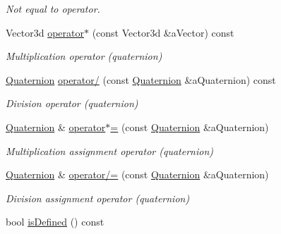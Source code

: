 \begin{DoxyCompactItemize}
\begin{DoxyCompactList}\small\item\em Not equal to operator. \end{DoxyCompactList}\item 
Vector3d \hyperlink{classlibrary_1_1math_1_1geom_1_1d3_1_1trf_1_1rot_1_1_quaternion_a7f09ef0c53cb1f2d68a5c0aa8fb9de56}{operator$\ast$} (const Vector3d \&a\+Vector) const
\begin{DoxyCompactList}\small\item\em Multiplication operator (quaternion) \end{DoxyCompactList}\item 
\hyperlink{classlibrary_1_1math_1_1geom_1_1d3_1_1trf_1_1rot_1_1_quaternion}{Quaternion} \hyperlink{classlibrary_1_1math_1_1geom_1_1d3_1_1trf_1_1rot_1_1_quaternion_af2e72e5232106d28995dbddb1f1c2f16}{operator/} (const \hyperlink{classlibrary_1_1math_1_1geom_1_1d3_1_1trf_1_1rot_1_1_quaternion}{Quaternion} \&a\+Quaternion) const
\begin{DoxyCompactList}\small\item\em Division operator (quaternion) \end{DoxyCompactList}\item 
\hyperlink{classlibrary_1_1math_1_1geom_1_1d3_1_1trf_1_1rot_1_1_quaternion}{Quaternion} \& \hyperlink{classlibrary_1_1math_1_1geom_1_1d3_1_1trf_1_1rot_1_1_quaternion_ae6ac96798a047bdfedf344dfba6abafc}{operator$\ast$=} (const \hyperlink{classlibrary_1_1math_1_1geom_1_1d3_1_1trf_1_1rot_1_1_quaternion}{Quaternion} \&a\+Quaternion)
\begin{DoxyCompactList}\small\item\em Multiplication assignment operator (quaternion) \end{DoxyCompactList}\item 
\hyperlink{classlibrary_1_1math_1_1geom_1_1d3_1_1trf_1_1rot_1_1_quaternion}{Quaternion} \& \hyperlink{classlibrary_1_1math_1_1geom_1_1d3_1_1trf_1_1rot_1_1_quaternion_af3b5e885a6ea4700d9404a58860ff250}{operator/=} (const \hyperlink{classlibrary_1_1math_1_1geom_1_1d3_1_1trf_1_1rot_1_1_quaternion}{Quaternion} \&a\+Quaternion)
\begin{DoxyCompactList}\small\item\em Division assignment operator (quaternion) \end{DoxyCompactList}\item 
bool \hyperlink{classlibrary_1_1math_1_1geom_1_1d3_1_1trf_1_1rot_1_1_quaternion_adf3d76908b0b95dc3a0310de17ba18b5}{is\+Defined} () const

\end{DoxyCompactItemize}

